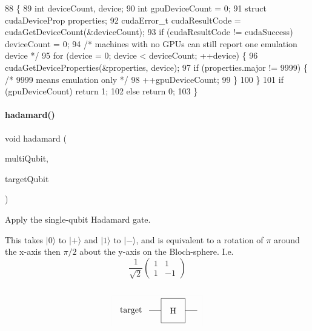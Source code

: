\begin{DoxyCode}
88                    \{
89     \textcolor{keywordtype}{int} deviceCount, device;
90     \textcolor{keywordtype}{int} gpuDeviceCount = 0;
91     \textcolor{keyword}{struct }cudaDeviceProp properties;
92     cudaError\_t cudaResultCode = cudaGetDeviceCount(&deviceCount);
93     \textcolor{keywordflow}{if} (cudaResultCode != cudaSuccess) deviceCount = 0;
94     \textcolor{comment}{/* machines with no GPUs can still report one emulation device */}
95     \textcolor{keywordflow}{for} (device = 0; device < deviceCount; ++device) \{
96         cudaGetDeviceProperties(&properties, device);
97         \textcolor{keywordflow}{if} (properties.major != 9999) \{ \textcolor{comment}{/* 9999 means emulation only */}
98             ++gpuDeviceCount;
99         \}
100     \}
101     \textcolor{keywordflow}{if} (gpuDeviceCount) \textcolor{keywordflow}{return} 1;
102     \textcolor{keywordflow}{else} \textcolor{keywordflow}{return} 0;
103 \}
\end{DoxyCode}
\mbox{\label{QuEST__env__localGPU_8cu_aa09b5dd93de6df1384b8f2c0041749ab}} 
\paragraph{\texorpdfstring{hadamard()}{hadamard()}}
{\footnotesize\ttfamily void hadamard (\begin{DoxyParamCaption}\item[{\mbox{\hyperlink{structMultiQubit}{Multi\+Qubit}}}]{multi\+Qubit,  }\item[{const int}]{target\+Qubit }\end{DoxyParamCaption})}



Apply the single-\/qubit Hadamard gate. 

This takes $|0\rangle$ to $|+\rangle$ and $|1\rangle$ to $|-\rangle$, and is equivalent to a rotation of $\pi$ around the x-\/axis then $\pi/2$ about the y-\/axis on the Bloch-\/sphere. I.\+e. \[ \frac{1}{\sqrt{2}} \begin{pmatrix} 1 & 1 \\ 1 & -1 \end{pmatrix} \] ~\newline
 \[ \setlength{\fboxrule}{0.01pt} \fbox{ \begin{tikzpicture}[scale=.5] \node[draw=none] at (-3.5, 0) {target}; \draw (-2,0) -- (-1, 0); \draw (1, 0) -- (2, 0); \draw (-1,-1)--(-1,1)--(1,1)--(1,-1)--cycle; \node[draw=none] at (0, 0) {H}; \end{tikzpicture} } \] ~\newline
 
